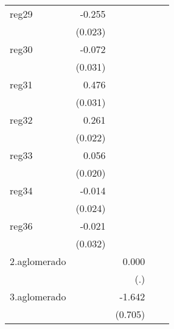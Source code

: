 {\begin{longtable}{l*{4}{D{.}{.}{-1}}}
\addlinespace
reg29       &      -0.255\sym{***}&                     &                     &                     \\
            &     (0.023)         &                     &                     &                     \\
\addlinespace
reg30       &      -0.072\sym{*}  &                     &                     &                     \\
            &     (0.031)         &                     &                     &                     \\
\addlinespace
reg31       &       0.476\sym{***}&                     &                     &                     \\
            &     (0.031)         &                     &                     &                     \\
\addlinespace
reg32       &       0.261\sym{***}&                     &                     &                     \\
            &     (0.022)         &                     &                     &                     \\
\addlinespace
reg33       &       0.056\sym{**} &                     &                     &                     \\
            &     (0.020)         &                     &                     &                     \\
\addlinespace
reg34       &      -0.014         &                     &                     &                     \\
            &     (0.024)         &                     &                     &                     \\
\addlinespace
reg36       &      -0.021         &                     &                     &                     \\
            &     (0.032)         &                     &                     &                     \\
\addlinespace
2.aglomerado&                     &       0.000         &                     &                     \\
            &                     &         (.)         &                     &                     \\
\addlinespace
3.aglomerado&                     &      -1.642\sym{*}  &                     &                     \\
            &                     &     (0.705)         &                     &                     \\

\end{longtable}}

